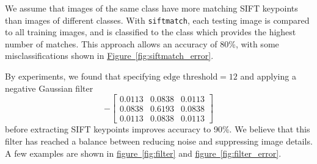 \documentclass[11pt,a4paper]{article}
\begin{document}
We assume that images of the same class have more matching SIFT keypoints than images of different classes. With \texttt{siftmatch}, each testing image is compared to all training images, and is classified to the class which provides the highest number of matches. This approach allows an accuracy of 80\%, with some misclassifications shown in \hyperref[fig:siftmatch_error]{Figure~\ref{fig:siftmatch_error}}.

By experiments, we found that specifying $\text{edge threshold}=12$ and applying a negative Gaussian filter\cite{Brahmbhatt,lindeberg1996scale}
\[
-\begin{bmatrix}
0.0113 & 0.0838 & 0.0113\\ 
0.0838 & 0.6193 & 0.0838\\ 
0.0113 & 0.0838 & 0.0113
\end{bmatrix}
\]
before extracting SIFT keypoints improves accuracy to 90\%. We believe that this filter has reached a balance between reducing noise and suppressing image details. A few examples are shown in \hyperref[fig:filter]{figure~\ref{fig:filter}} and \hyperref[fig:filter_error]{figure~\ref{fig:filter_error}}.
\end{document}
